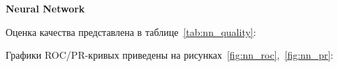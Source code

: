 \pagebreak
\textbf{Neural Network}

Оценка качества представлена в таблице~\ref{tab:nn_quality}:

\begin{table}[h]
    \caption{Значения метрик для нейросети}
    \label{tab:nn_quality}
\end{table}

Графики ROC/PR-кривых приведены на рисунках~\ref{fig:nn_roc},~\ref{fig:nn_pr}:

